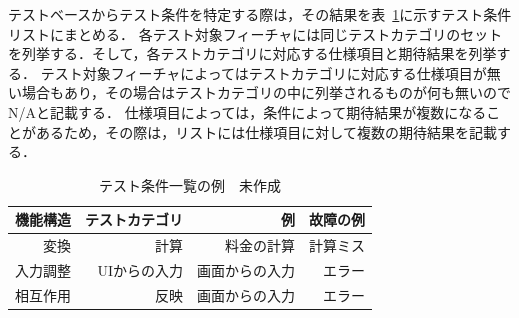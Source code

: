 \documentclass[a4paper,12pt]{jreport}
\begin{document}
テストベースからテスト条件を特定する際は，その結果を表~\ref{tbl:D-3-tbl2}に示すテスト条件リストにまとめる．
各テスト対象フィーチャには同じテストカテゴリのセットを列挙する．そして，各テストカテゴリに対応する仕様項目と期待結果を列挙する．
 テスト対象フィーチャによってはテストカテゴリに対応する仕様項目が無い場合もあり，その場合はテストカテゴリの中に列挙されるものが何も無いのでN/Aと記載する．
仕様項目によっては，条件によって期待結果が複数になることがあるため，その際は，リストには仕様項目に対して複数の期待結果を記載する．

\begin{table}[t]
\caption{テスト条件一覧の例　未作成}
\label{tbl:D-3-tbl2}
\begin{center}
\begin{tabular}{r|r|r|r}
機能構造&テストカテゴリ&例&故障の例\\
\hline
\hline
変換&計算&料金の計算&計算ミス\\
\hline
入力調整&UIからの入力&画面からの入力&エラー\\
\hline
相互作用&反映&画面からの入力&エラー\\
    \hline
\end{tabular}%
\end{center}
\end{table}
\end{document}

